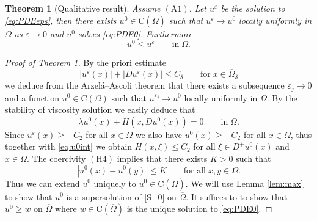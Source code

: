 \documentclass[11pt,reqno]{amsart}
\numberwithin{figure}{section}
\theoremstyle{plain}
\newtheorem{thm}{Theorem}[section]
\theoremstyle{remark}
\numberwithin{equation}{section}
\newcommand{\rmC}{\mathrm{C}}
\begin{document}
\begin{thm}[Qualitative result]\label{thm:qual} Assume $\mathrm{(A1)}$. Let $u^\varepsilon$ be the solution to \eqref{eq:PDEeps}, then there exists $u^0 \in \mathrm{C}(\overline{\Omega})$ such that $u^\varepsilon \rightarrow u^0$ locally uniformly in $\Omega$ as $\varepsilon\rightarrow 0$ and $u^0$ solves \eqref{eq:PDE0}. Furthermore 
\begin{equation*}
    u^0 \leq u^\varepsilon \qquad\text{in}\;\Omega.
\end{equation*}
\end{thm}

\begin{proof}[Proof of Theorem \ref{thm:qual}] By the priori estimate
\begin{equation*}
    |u^\varepsilon(x)| + |Du^\varepsilon(x)| \leq C_\delta \qquad\text{for}\;x\in \overline{\Omega}_\delta
\end{equation*}
we deduce from the Arzel\'a--Ascoli theorem that there exists a subsequence $\varepsilon_j\to 0$ and a function $u^0\in \rmC(\Omega)$ such that $u^{\varepsilon_j}\to u^0$ locally uniformly in $\Omega$. By the stability of viscosity solution we easily deduce that 
\begin{equation}\label{eq:u0int}
   \lambda u^0(x) + H(x,Du^0(x)) = 0 \qquad\text{in}\;\Omega.
\end{equation}
Since $u^\varepsilon(x)\geq -C_2$ for all $x\in \Omega$ we also have $u^0(x)\geq -C_2$ for all $x\in \Omega$, thus together with \eqref{eq:u0int} we obtain $H(x,\xi) \leq C_2$ for all $\xi\in D^+u^0(x)$ and $x\in \Omega$. The coercivity $\mathrm{(H4)}$ implies that there exists $K>0$ such that 
\begin{equation*}
    |u^0(x) - u^0(y)| \leq K \qquad\text{for all}\;x,y\in \Omega.
\end{equation*}
Thus we can extend $u^0$ uniquely to $u^0\in \rmC(\overline{\Omega})$. We will use Lemma \ref{lem:max} to show that $u^0$ is a supersolution of \eqref{S_0} on $\overline{\Omega}$. It suffices to to show that $u^0\geq w$ on $\overline{\Omega}$ where $w\in \rmC(\overline{\Omega})$ is the unique solution to \eqref{eq:PDE0}.


\end{proof}
\end{document}
